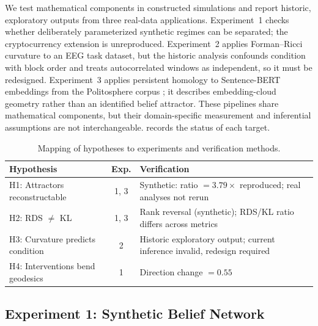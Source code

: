 \documentclass[11pt,a4paper]{article}
\theoremstyle{definition}
\begin{document}
We test mathematical components in constructed simulations and report historic, exploratory outputs from three real-data applications. Experiment~1 checks whether deliberately parameterized synthetic regimes can be separated; the cryptocurrency extension is unreproduced. Experiment~2 applies Forman--Ricci curvature to an EEG task dataset, but the historic analysis confounds condition with block order and treats autocorrelated windows as independent, so it must be redesigned. Experiment~3 applies persistent homology to Sentence-BERT embeddings \citep{reimers2019sentence} from the Politosphere corpus \citep{hofmann2022politosphere}; it describes embedding-cloud geometry rather than an identified belief attractor. These pipelines share mathematical components, but their domain-specific measurement and inferential assumptions are not interchangeable.  records the status of each target.

\begin{table}[t]
\centering
\small
\caption{Mapping of hypotheses to experiments and verification methods.}
\label{tab:hypothesis_mapping}
\begin{tabular}{@{}lcp{5.5cm}@{}}
\toprule
Hypothesis & Exp. & Verification \\
\midrule
H1: Attractors reconstructable & 1, 3 & Synthetic: ratio $= 3.79\times$ reproduced; real analyses not rerun \\
H2: RDS $\neq$ KL & 1, 3 & Rank reversal (synthetic); RDS/KL ratio differs across metrics \\
H3: Curvature predicts condition & 2 & Historic exploratory output; current inference invalid, redesign required \\
H4: Interventions bend geodesics & 1 & Direction change $= 0.55$ \\
\bottomrule
\end{tabular}
\end{table}

\subsection{Experiment 1: Synthetic Belief Network}
\label{sec:exp1}
\end{document}
